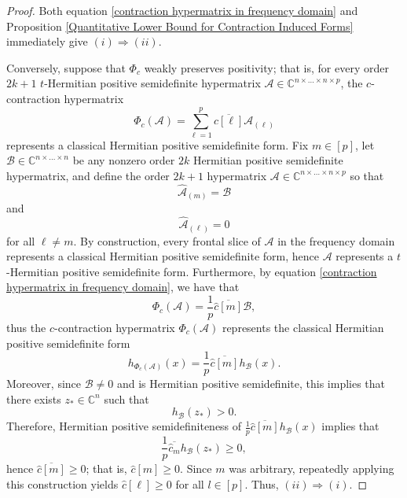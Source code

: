 \documentclass[11pt]{article}
\begin{document}
\begin{proof}
    Both equation \eqref{contraction hypermatrix in frequency domain} and Proposition \ref{Quantitative Lower Bound for Contraction Induced Forms} immediately give $(i)\Rightarrow (ii)$. 

    Conversely, suppose that $\Phi_c$ weakly preserves positivity; that is, for every order $2k+1$ $t$-Hermitian positive semidefinite hypermatrix $\mathcal{A}\in \mathbb{C}^{n\times\dots\times n\times p}$, the $c$-contraction hypermatrix
    \[\Phi_c(\mathcal{A}) = \sum\limits_{\ell=1}^p\overline{c[\ell]}\mathcal{A}_{(\ell)}\]
    represents a classical Hermitian positive semidefinite form. Fix $m\in [p]$, let $\mathcal{B}\in\mathbb{C}^{n\times\dots\times n}$ be any nonzero order $2k$ Hermitian positive semidefinite hypermatrix, and define the order $2k+1$ hypermatrix $\mathcal{A}\in \mathbb{C}^{n\times\dots\times n\times p}$ so that 
    \[\widehat{\mathcal{A}}_{(m)} = \mathcal{B}\]
    and 
    \[\widehat{\mathcal{A}}_{(\ell)} = 0\]
    for all $\ell\neq m$. By construction, every frontal slice of $\mathcal{A}$ in the frequency domain represents a classical Hermitian positive semidefinite form, hence $\mathcal{A}$ represents a $t$-Hermitian positive semidefinite form. Furthermore, by equation \eqref{contraction hypermatrix in frequency domain}, we have that  
    \[\Phi_c(\mathcal{A}) = \frac{1}{p}\overline{\widehat{c}[m]}\mathcal{B},\]
    thus the $c$-contraction hypermatrix $\Phi_c(\mathcal{A})$ represents the classical Hermitian positive semidefinite form
    \[h_{\Phi_c(\mathcal{A})}(x) = \frac{1}{p}\overline{\widehat{c}[m]}h_{\mathcal{B}}(x).\]
    Moreover, since $\mathcal{B}\neq 0$ and is Hermitian positive semidefinite, this implies that there exists $z_*\in \mathbb{C}^n$ such that 
    \[h_{\mathcal{B}}(z_*)>0.\]
    Therefore, Hermitian positive semidefiniteness of $\frac{1}{p}\overline{\widehat{c}[m]}h_{\mathcal{B}}(x)$ implies that 
    \[\frac{1}{p}\overline{\widehat{c}_m}h_{\mathcal{B}}(z_*)\geq 0,\]
    hence $\overline{\widehat{c}[m]}\geq 0$; that is, $\widehat{c}[m]\geq 0$. Since $m$ was arbitrary, repeatedly applying this construction yields $\widehat{c}[\ell]\geq 0$ for all $l\in [p]$. Thus, $(ii)\Rightarrow (i)$. 


\end{proof}
\end{document}
